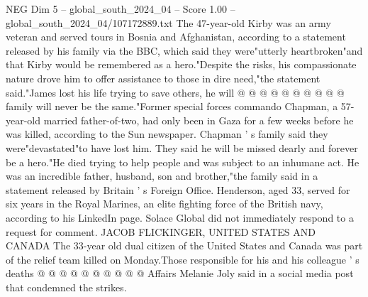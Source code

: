 \begin{textsample}{NEG Dim 5 – global\_south\_2024\_04 – Score 1.00 – global\_south\_2024\_04/107172889.txt}
The 47-year-old Kirby was an army veteran and served tours in Bosnia and Afghanistan, according to a statement released by his family via the BBC, which said they were"utterly heartbroken"and that Kirby would be remembered as a hero."Despite the risks, his compassionate nature drove him to offer assistance to those in dire need,"the statement said."James lost his life trying to save others, he will @ @ @ @ @ @ @ @ @ @ family will never be the same."Former special forces commando Chapman, a 57-year-old married father-of-two, had only been in Gaza for a few weeks before he was killed, according to the Sun newspaper.
Chapman ' s family said they were"devastated"to have lost him.
They said he will be missed dearly and forever be a hero."He died trying to help people and was subject to an inhumane act.
He was an incredible father, husband, son and brother,"the family said in a statement released by Britain ' s Foreign Office.
Henderson, aged 33, served for six years in the Royal Marines, an elite fighting force of the British navy, according to his LinkedIn page.
Solace Global did not immediately respond to a request for comment.
JACOB FLICKINGER, UNITED STATES AND CANADA The 33-year old dual citizen of the United States and Canada was part of the relief team killed on Monday.Those responsible for his and his colleague ' s deaths @ @ @ @ @ @ @ @ @ @ Affairs Melanie Joly said in a social media post that condemned the strikes.

\end{textsample}
